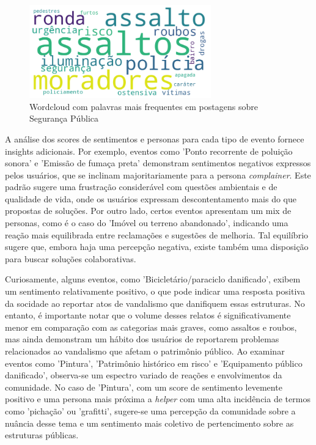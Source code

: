 \begin{figure}[htb]
	\centering
	\includegraphics[width=0.7\textwidth]{images/wordcloud_security.png}
	\caption{Wordcloud com palavras mais frequentes em postagens sobre Segurança Pública}
	\label{fig:wordcloud_security}
\end{figure}

A análise dos scores de sentimentos e personas para cada tipo de evento fornece insights adicionais. Por exemplo, eventos como 'Ponto recorrente de poluição sonora' e 'Emissão de fumaça preta' demonstram sentimentos negativos expressos pelos usuários, que se inclinam majoritariamente para a persona \textit{complainer}. Este padrão sugere uma frustração considerável com questões ambientais e de qualidade de vida, onde os usuários expressam descontentamento mais do que propostas de soluções. Por outro lado, certos eventos apresentam um mix de personas, como é o caso do 'Imóvel ou terreno abandonado', indicando uma reação mais equilibrada entre reclamações e sugestões de melhoria. Tal equilíbrio sugere que, embora haja uma percepção negativa, existe também uma disposição para buscar soluções colaborativas.

Curiosamente, alguns eventos, como 'Bicicletário/paraciclo danificado', exibem um sentimento relativamente positivo, o que pode indicar uma resposta positiva da socidade ao reportar atos de vandalismo que danifiquem essas estruturas. No entanto, é importante notar que o volume desses relatos é significativamente menor em comparação com as categorias mais graves, como assaltos e roubos, mas ainda demonstram um hábito dos usuários de reportarem problemas relacionados ao vandalismo que afetam o patrimônio público. Ao examinar eventos como 'Pintura', 'Patrimônio histórico em risco' e 'Equipamento público danificado', observa-se um espectro variado de reações e envolvimentos da comunidade. No caso de 'Pintura', com um score de sentimento levemente positivo e uma persona mais próxima a \textit{helper} com uma alta incidência de termos como 'pichação' ou 'grafitti', sugere-se uma percepção da comunidade sobre a nuância desse tema e um sentimento mais coletivo de pertencimento sobre as estruturas públicas.

